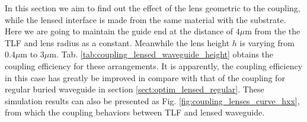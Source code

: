In this section we aim to find out the effect of the lens geometric to the coupling, while the lensed interface is made from the same material with the substrate. Here we are going to maintain the guide end at the distance of $4\mu$m from the the TLF and lens radius as a constant. Meanwhile the lens height $h$  is varying from $0.4\mu$m to $3\mu$m. Tab. \ref{tab:coupling_lensed_waveguide_height} obtains the coupling efficiency for these arrangements. It is apparently, the coupling efficiency in this case has greatly be improved in compare with that of the coupling for regular buried waveguide in section \ref{sect:optim_lensed_regular}. These simulation results can also be presented as Fig. \ref{fig:coupling_lenses_curve_hxx}, from which the coupling behaviors between TLF and lensed waveguide.\\  
  
